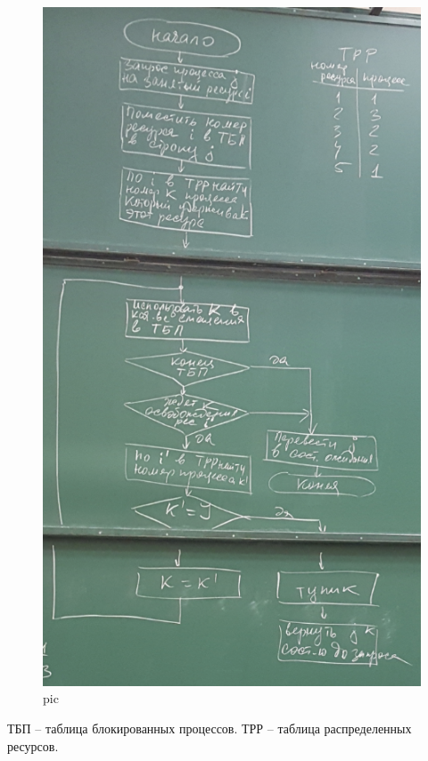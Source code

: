 \begin{figure}[H]
    \centering
    \includegraphics[width=\textwidth]{pic/2.png}
    \caption{pic}
\end{figure}

ТБП – таблица блокированных процессов. ТРР – таблица распределенных ресурсов.

